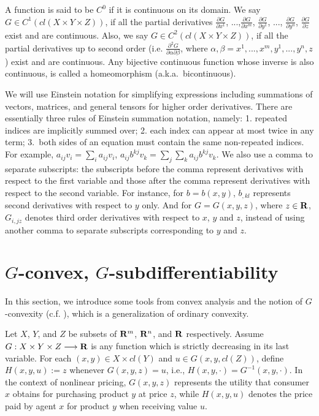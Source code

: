 A function is said to be $C^0$ if it is continuous on its domain. We say $G \in C^{1}(cl(X\times Y \times Z))$, if all the partial derivatives $\frac{\partial G}{\partial x^1}$, ...,$\frac{\partial G}{\partial x^m}$, $\frac{\partial G}{\partial y^1}$, ..., $\frac{\partial G}{\partial y^n}$, $\frac{\partial G}{\partial z}$ exist and are continuous. Also, we say $G \in C^{2}(cl(X\times Y \times Z))$, if all the partial derivatives up to second order (i.e. $\frac{\partial^2 G}{\partial \alpha \partial \beta}$, where $\alpha, \beta = x^1, ... , x^m, y^1, ..., y^n, z$) exist and are continuous. Any bijective continuous function whose inverse is also continuous, is called a homeomorphism (a.k.a.\ bicontinuous).
\medskip

We will use Einstein notation for simplifying expressions including summations of vectors, matrices, and general tensors for higher order derivatives. There are essentially three rules of Einstein summation notation, namely: 1. repeated indices are implicitly summed over; 2. each index can appear at most twice in any term; 3.~both sides of an equation must contain the same non-repeated indices. For example, $a_{ij}v_i =\sum_{i}a_{ij}v_i$, $a_{ij}b^{kj}v_k=\sum_{j}\sum_{k}a_{ij}b^{kj}v_k$. We also use a comma to separate subscripts: the subscripts before the comma represent derivatives with respect to the first variable and those after the comma represent derivatives with respect to the second variable. For instance, for $b=b(x,y)$, $b_{,kl}$ represents second derivatives with respect to $y$ only. And for $G=G(x,y,z)$, where $z\in {\mathbf R}$, $G_{i,jz}$ denotes third order derivatives with respect to $x$, $y$ and $z$, instead of using another comma to separate subscripts corresponding to $y$ and $z$.\medskip


\section{$G$-convex, $G$-subdifferentiability}\label{section:G-convexity}
In this section, we introduce some tools from convex analysis and the notion of $G$-convexity  (c.f. \cite{Trudinger14,Balder77,Singer97}), which is a generalization of ordinary convexity. \medskip

Let $X$, $Y$, and $Z$ be subsets of ${\mathbf R}^m$, ${\mathbf R}^n$, and ${\mathbf R}$ respectively. Assume $G: X \times Y \times Z \longrightarrow {\mathbf R}$ is any function which is strictly decreasing in its last variable. For each $(x, y) \in X\times cl(Y)$ and $u\in G(x,y, cl(Z))$, define $H(x,y,u) := z$ whenever $G(x,y,z) = u$, i.e., $H(x, y, \cdot)= G^{-1}(x,y,\cdot)$. In the context of nonlinear pricing, $G(x,y,z)$ represents the utility that consumer $x$ obtains for purchasing product $y$ at price $z$, while $H(x,y,u)$ denotes the price paid by agent $x$ for product $y$ when receiving value $u$. \medskip


